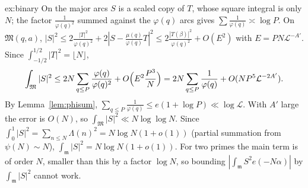 \begin{solution}{ex:binary}
\idea On the major arcs $S$ is a scaled copy of $T$, whose square integral is only $N$; the factor $\frac1{\varphi(q)^2}$ summed against the $\varphi(q)$ arcs gives $\sum\frac1{\varphi(q)}\asymp\log P$.
\writeup On $\mathfrak M(q,a)$, $|S|^2\le2\frac{|T|^2}{\varphi(q)^2}+2|S-\frac{\mu(q)}{\varphi(q)}T|^2\le2\frac{|T(\beta)|^2}{\varphi(q)^2}+O(E^2)$ with $E=PN\mathcal L^{-A'}$. Since $\int_{-1/2}^{1/2}|T|^2=\lfloor N\rfloor$,
\[
\int_{\mathfrak M}|S|^2\le2N\sum_{q\le P}\frac{\varphi(q)}{\varphi(q)^2}+O\Bigl(E^2\frac{P^3}N\Bigr)=2N\sum_{q\le P}\frac1{\varphi(q)}+O(NP^5\mathcal L^{-2A'}).
\]
By Lemma~\ref{lem:phisum}, $\sum_{q\le P}\frac1{\varphi(q)}\le e(1+\log P)\ll\log\mathcal L$. With $A'$ large the error is $O(N)$, so $\int_{\mathfrak M}|S|^2\ll N\log\log N$. Since $\int_0^1|S|^2=\sum_{n\le N}\Lambda(n)^2=N\log N(1+o(1))$ (partial summation from $\psi(N)\sim N$), $\int_{\mathfrak m}|S|^2=N\log N(1+o(1))$. For two primes the main term is of order $N$, smaller than this by a factor $\log N$, so bounding $|\int_{\mathfrak m}S^2e(-N\alpha)|$ by $\int_{\mathfrak m}|S|^2$ cannot work.
\end{solution}
